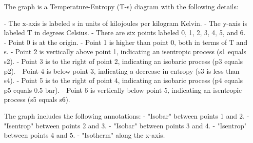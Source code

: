 The graph is a Temperature-Entropy (T-s) diagram with the following details:

- The x-axis is labeled s in units of kilojoules per kilogram Kelvin.
- The y-axis is labeled T in degrees Celsius.
- There are six points labeled 0, 1, 2, 3, 4, 5, and 6.
- Point 0 is at the origin.
- Point 1 is higher than point 0, both in terms of T and s.
- Point 2 is vertically above point 1, indicating an isentropic process (s1 equals s2).
- Point 3 is to the right of point 2, indicating an isobaric process (p3 equals p2).
- Point 4 is below point 3, indicating a decrease in entropy (s3 is less than s4).
- Point 5 is to the right of point 4, indicating an isobaric process (p4 equals p5 equals 0.5 bar).
- Point 6 is vertically below point 5, indicating an isentropic process (s5 equals s6).

The graph includes the following annotations:
- "Isobar" between points 1 and 2.
- "Isentrop" between points 2 and 3.
- "Isobar" between points 3 and 4.
- "Isentrop" between points 4 and 5.
- "Isotherm" along the x-axis.